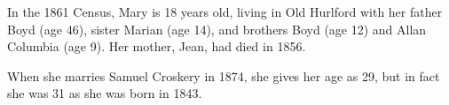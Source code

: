 
In the 1861 Census, Mary is 18 years old, living in Old Hurlford with her father Boyd (age 46), sister Marian (age 14), and brothers Boyd (age 12) and Allan Columbia (age 9). Her mother, Jean, had died in 1856.

When she marries Samuel Croskery in 1874, she gives her age as 29, but in fact she was 31 as she was born in 1843. 
